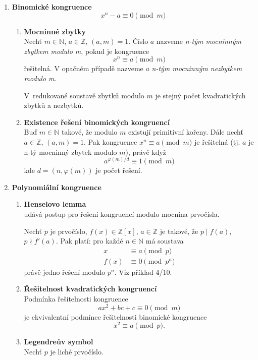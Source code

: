 \documentclass[12pt,a4paper]{article}
\begin{document}
\begin{enumerate}[leftmargin=*]
	\item \textbf{Binomické kongruence}
		\[ x^n -a \equiv 0 \pmod{m} \]

	\begin{enumerate}
		\item \textbf{Mocninné zbytky}\\
			Nechť $m \in \mathbb{N}$, $a \in \mathbb{Z}$, $(a,m) = 1$. Číslo $a$
			nazveme \textit{n-tým mocninným zbytkem modulo m}, pokud je kongruence
			\[ x^n \equiv a \pmod{m} \]
			řešitelná. V opačném případě nazveme $a$ \textit{n-tým mocninným
			nezbytkem modulo m}.

			V~redukované soustavě zbytků modulo $m$ je stejný počet
			kvadratických zbytků a nezbytků.

		\item \textbf{Existence řešení binomických kongruencí}\\
			Buď $m \in \mathbb{N}$ takové, že modulo $m$ existují primitivní
			kořeny.  Dále nechť $a \in \mathbb{Z}$, $(a,m) = 1$. Pak kongruence
			$x^n \equiv a \pmod{m}$ je řešitelná (tj. $a$ je n-tý mocninný
			zbytek modulo $m$), právě když
			\[ a^{\varphi(m)/d} \equiv 1 \pmod{m} \]
			kde $d = (n, \varphi(m))$ je počet řešení.
	\end{enumerate}

	\item \textbf{Polynomiální kongruence}
	\begin{enumerate}
		\item \textbf{Henselovo lemma}\\
			udává postup pro řešení kongruencí modulo mocnina
			prvočísla.

			Nechť $p$ je prvočíslo, $f(x) \in \mathbb{Z}[x]$, $a \in
			\mathbb{Z}$ je takové, že $p \mid f(a)$, $p \nmid f'(a)$. Pak
			platí: pro každé $n \in \mathbb{N}$ má soustava
			\begin{align*}
				x &\equiv a \pmod{p}\\
				f(x) &\equiv 0 \pmod{p^n}
			\end{align*}
			právě jedno řešení modulo $p^n$. Viz příklad 4/10.

		\item \textbf{Řešitelnost kvadratických kongruencí}\\
			Podmínka řešitelnosti kongruence
			\[ ax^2 + bc + c \equiv 0 \pmod{m} \]
			je ekvivalentní podmínce řešitelnosti binomické kongruence
			\[ x^2 \equiv a \pmod{p}. \]

		\item \textbf{Legendreův symbol}\\
			Nechť $p$ je liché prvočíslo.


\end{enumerate}
\end{enumerate}
\end{document}
